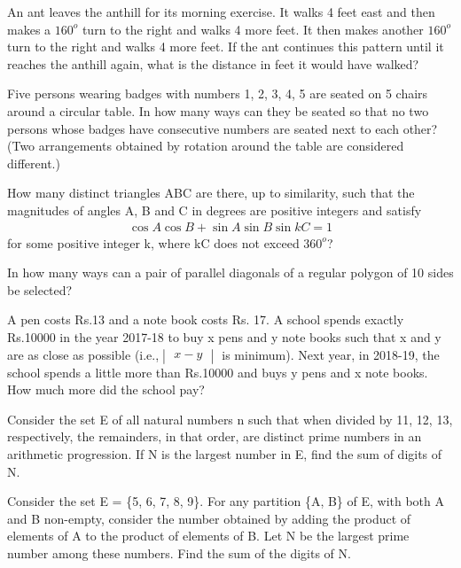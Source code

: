 \item An ant leaves the anthill for its morning exercise. It walks 4 feet east and then makes a $160^{o}$ turn to the right and walks 4 more feet. It then makes another $160^{o}$  turn to the right and walks 4 more feet. If the ant continues this pattern until it reaches the anthill again, what is the distance in feet it would have walked?

\item Five persons wearing badges with numbers 1, 2, 3, 4, 5 are seated on 5 chairs around a circular table. In how many ways can they be seated so that no two persons whose badges have consecutive numbers are seated next to each other? 
(Two arrangements obtained by rotation around the table are considered different.)

\item How many distinct triangles ABC are there, up to similarity, such that the magnitudes of angles A, B and C in degrees are positive integers and satisfy
\begin{align*}
\cos A \cos B + \sin A \sin B \sin kC = 1
\end{align*}
for some positive integer k, where kC does not exceed $360^{o}$?

\item  In how many ways can a pair of parallel diagonals of a regular polygon of 10 sides be selected?

\item A pen costs Rs.13 and a note book costs Rs. 17. A school spends exactly Rs.10000 in the year 2017-18 to buy x pens and y note books such that x and y are as close as possible (i.e.,$\begin{vmatrix} x - y \end{vmatrix}$ is minimum). Next year, in 2018-19, the school spends a little more than Rs.10000 and buys y pens and x note books. How much more did the school pay?

\item Consider the set E of all natural numbers n such that when divided by 11, 12, 13, respectively, the remainders, in that order, are distinct prime numbers in an arithmetic progression. If N is the largest number in E, find the sum of digits of N.

\item Consider the set E = \{5, 6, 7, 8, 9\}. For any partition \{A, B\} of E, with both A and B non-empty, consider the number obtained by adding the product of elements of A to the product of elements of B. Let N be the largest prime number among these numbers. Find the sum of the digits of N.

